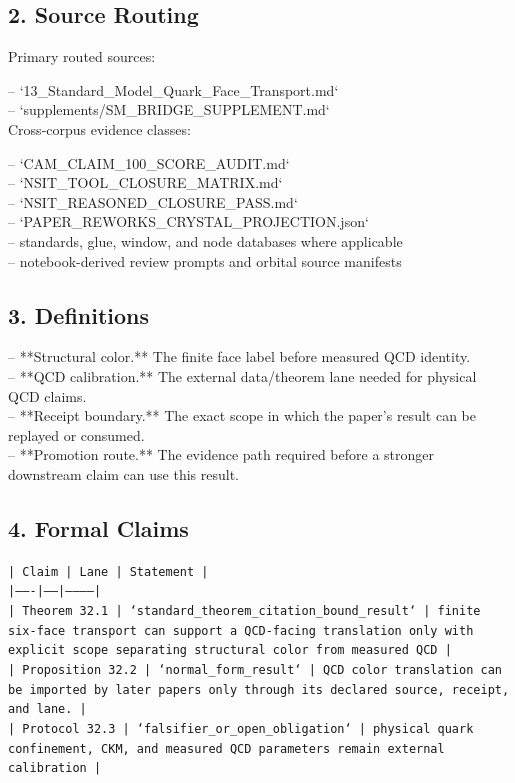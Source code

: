 \documentclass[11pt]{article}
\begin{document}
\subsection*{2. Source Routing}

Primary routed sources:

\noindent{}-- `13\_Standard\_Model\_Quark\_Face\_Transport.md`\\
\noindent{}-- `supplements/SM\_BRIDGE\_SUPPLEMENT.md`\\

Cross-corpus evidence classes:

\noindent{}-- `CAM\_CLAIM\_100\_SCORE\_AUDIT.md`\\
\noindent{}-- `NSIT\_TOOL\_CLOSURE\_MATRIX.md`\\
\noindent{}-- `NSIT\_REASONED\_CLOSURE\_PASS.md`\\
\noindent{}-- `PAPER\_REWORKS\_CRYSTAL\_PROJECTION.json`\\
\noindent{}-- standards, glue, window, and node databases where applicable\\
\noindent{}-- notebook-derived review prompts and orbital source manifests\\

\subsection*{3. Definitions}

\noindent{}-- **Structural color.** The finite face label before measured QCD identity.\\
\noindent{}-- **QCD calibration.** The external data/theorem lane needed for physical QCD claims.\\
\noindent{}-- **Receipt boundary.** The exact scope in which the paper's result can be replayed or consumed.\\
\noindent{}-- **Promotion route.** The evidence path required before a stronger downstream claim can use this result.\\

\subsection*{4. Formal Claims}

\noindent\texttt{| Claim | Lane | Statement |}\\
\noindent\texttt{|-------|------|-----------|}\\
\noindent\texttt{| Theorem 32.1 | `standard\_theorem\_citation\_bound\_result` | finite six-face transport can support a QCD-facing translation only with explicit scope separating structural color from measured QCD |}\\
\noindent\texttt{| Proposition 32.2 | `normal\_form\_result` | QCD color translation can be imported by later papers only through its declared source, receipt, and lane. |}\\
\noindent\texttt{| Protocol 32.3 | `falsifier\_or\_open\_obligation` | physical quark confinement, CKM, and measured QCD parameters remain external calibration |}\\
\end{document}
